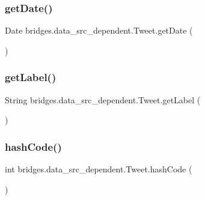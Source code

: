 \hypertarget{classbridges_1_1data__src__dependent_1_1_tweet_a801b0b5ea0127746c9c8ec0fc5e35ac2}{}\label{classbridges_1_1data__src__dependent_1_1_tweet_a801b0b5ea0127746c9c8ec0fc5e35ac2} 
\subsubsection{\texorpdfstring{get\+Date()}{getDate()}}
{\footnotesize\ttfamily Date bridges.\+data\+\_\+src\+\_\+dependent.\+Tweet.\+get\+Date (\begin{DoxyParamCaption}{ }\end{DoxyParamCaption})}

\hypertarget{classbridges_1_1data__src__dependent_1_1_tweet_a4b31431e42327efa953adde4c15cf168}{}\label{classbridges_1_1data__src__dependent_1_1_tweet_a4b31431e42327efa953adde4c15cf168} 
\subsubsection{\texorpdfstring{get\+Label()}{getLabel()}}
{\footnotesize\ttfamily String bridges.\+data\+\_\+src\+\_\+dependent.\+Tweet.\+get\+Label (\begin{DoxyParamCaption}{ }\end{DoxyParamCaption})}

\hypertarget{classbridges_1_1data__src__dependent_1_1_tweet_adf7dadcda59b68bb00b42480e4ad9956}{}\label{classbridges_1_1data__src__dependent_1_1_tweet_adf7dadcda59b68bb00b42480e4ad9956} 
\subsubsection{\texorpdfstring{hash\+Code()}{hashCode()}}
{\footnotesize\ttfamily int bridges.\+data\+\_\+src\+\_\+dependent.\+Tweet.\+hash\+Code (\begin{DoxyParamCaption}{ }\end{DoxyParamCaption})}

